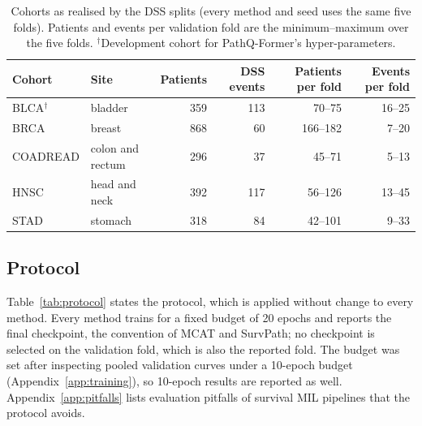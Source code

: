 \documentclass{article}
\newcommand{\pq}{PathQ-Former}
\begin{document}
\begin{table}[t]
\caption{Cohorts as realised by the DSS splits (every method and seed uses the same five folds). Patients and events per validation fold are the minimum--maximum over the five folds. $^\dagger$Development cohort for \pq{}'s hyper-parameters.}
\label{tab:cohorts}
\centering
\small
\begin{tabular}{@{}llrrrr@{}}
\toprule
Cohort & Site & Patients & DSS events & Patients per fold & Events per fold \\
\midrule
BLCA$^\dagger$ & bladder & 359 & 113 & 70--75 & 16--25 \\
BRCA & breast & 868 & 60 & 166--182 & 7--20 \\
COADREAD & colon and rectum & 296 & 37 & 45--71 & 5--13 \\
HNSC & head and neck & 392 & 117 & 56--126 & 13--45 \\
STAD & stomach & 318 & 84 & 42--101 & 9--33 \\
\bottomrule
\end{tabular}
\end{table}

\subsection{Protocol}
\label{sec:protocol}
Table~\ref{tab:protocol} states the protocol, which is applied without change to every method. Every method trains for a fixed budget of 20 epochs and reports the final checkpoint, the convention of MCAT and SurvPath; no checkpoint is selected on the validation fold, which is also the reported fold. The budget was set after inspecting pooled validation curves under a 10-epoch budget (Appendix~\ref{app:training}), so 10-epoch results are reported as well. Appendix~\ref{app:pitfalls} lists evaluation pitfalls of survival MIL pipelines that the protocol avoids.
\end{document}
